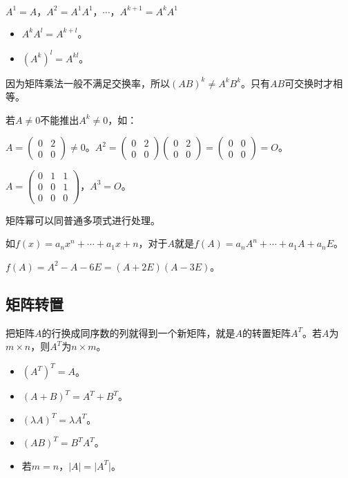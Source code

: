 \documentclass[UTF8, 12pt]{ctexart}
\begin{document}
$A^1=A\text{，}A^2=A^1A^1\text{，}\cdots\text{，}A^{k+1}=A^kA^1$

\begin{itemize}
    \item $A^kA^l=A^{k+l}$。
    \item $(A^k)^l=A^{kl}$。
\end{itemize}

因为矩阵乘法一般不满足交换率，所以$(AB)^k\neq A^kB^k$。只有$AB$可交换时才相等。

若$A\neq 0$不能推出$A^k\neq 0$，如：\medskip

$A=\left(
    \begin{array}{cc}
        0 & 2 \\
        0 & 0
    \end{array}
\right)\neq 0$。$A^2=\left(
    \begin{array}{cc}
        0 & 2 \\
        0 & 0
    \end{array}
\right)\left(
    \begin{array}{cc}
        0 & 2 \\
        0 & 0
    \end{array}
\right)=\left(
    \begin{array}{cc}
        0 & 0 \\
        0 & 0
    \end{array}
\right)=O$。\medskip

$A=\left(
    \begin{array}{ccc}
        0 & 1 & 1 \\
        0 & 0 & 1 \\
        0 & 0 & 0
    \end{array}
\right)$，$A^3=O$。\medskip

矩阵幂可以同普通多项式进行处理。

如$f(x)=a_nx^n+\cdots+a_1x+n$，对于$A$就是$f(A)=a_nA^n+\cdots+a_1A+a_nE$。

$f(A)=A^2-A-6E=(A+2E)(A-3E)$。

\subsection{矩阵转置}

把矩阵$A$的行换成同序数的列就得到一个新矩阵，就是$A$的转置矩阵$A^T$。若$A$为$m\times n$，则$A^T$为$n\times m$。

\begin{itemize}
    \item $(A^T)^T=A$。
    \item $(A+B)^T=A^T+B^T$。
    \item $(\lambda A)^T=\lambda A^T$。
    \item $(AB)^T=B^TA^T$。
    \item 若$m=n$，$\vert A\vert=\vert A^T\vert$。
\end{itemize}
\end{document}
